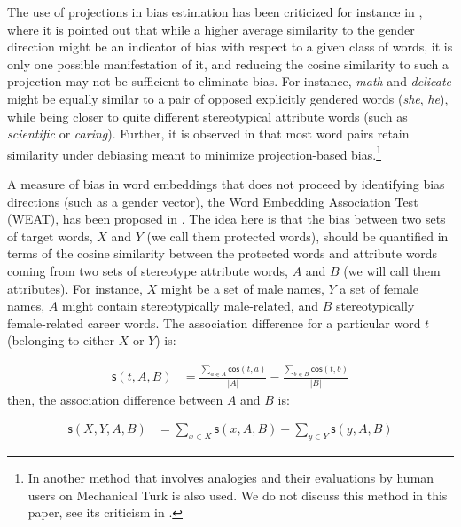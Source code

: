 \documentclass{clv3}
\begin{document}
The use of projections in bias estimation has been criticized for
instance in \citep{Gonen2019lipstick}, where it is pointed out that while a higher average
similarity to the gender direction might be an indicator of bias with
respect to a given class of words, it is only one possible manifestation
of it, and reducing the cosine similarity to such a projection may not
be sufficient to eliminate bias. For instance, \emph{math} and \emph{delicate} 
might be equally similar to a pair of opposed explicitly gendered words
(\emph{she}, \emph{he}), while being closer to quite different
stereotypical attribute words (such as \emph{scientific} or
\emph{caring}). Further, it is observed in \citep{Gonen2019lipstick} that most word pairs
retain similarity under debiasing meant to minimize projection-based
bias.\footnote{In \citep{Bolukbasi2016man} another method that involves analogies and
  their evaluations by human users on Mechanical Turk is also used. We
  do not discuss this method in this paper, see its criticism in
  \citep{Nissim2020fair}.}

A measure of bias in word embeddings that does not proceed by
identifying bias directions (such as a gender vector), the Word
Embedding Association Test (\textsf{WEAT}), has been proposed in
\citep{Caliskan2017semanticsBiases}. The idea here is that the bias between two sets of target
words, \(X\) and \(Y\) (we call them protected words), should be
quantified in terms of the cosine similarity between the protected words
and attribute words coming from two sets of stereotype attribute words,
\(A\) and \(B\) (we will call them attributes). For instance, \(X\)
might be a set of male names, \(Y\) a set of female names, \(A\) might
contain stereotypically male-related, and \(B\) stereotypically
female-related career words. The association difference for a particular
word \(t\) (belonging to either \(X\) or \(Y\)) is:

\vspace{-2mm}

\begin{align}
\label{eq:stAB}
\mathsf{s}(t,A,B) & = \frac{\sum_{a\in A}\mathsf{cos}(t,a)}{\vert A\vert} - \frac{\sum_{b\in B}\mathsf{cos}(t,b)}{\vert B\vert}
\end{align} \normalsize \noindent then, the association difference
between \(A\) and \(B\) is:

\begin{align}
\label{eq:sXYAB}
\mathsf{s}(X,Y,A,B) & = \sum_{x\in X} \mathsf{s}(x,A,B) -  \sum_{y\in Y} \mathsf{s}(y,A,B)
\end{align}
\end{document}

